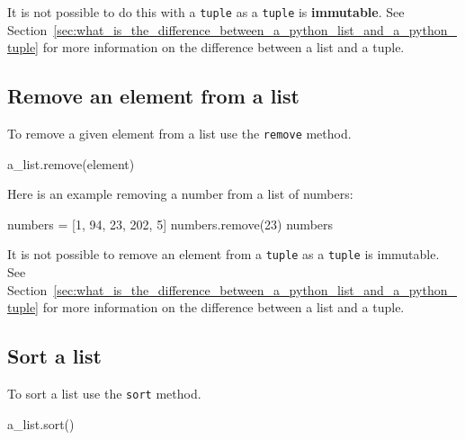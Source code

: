 \begin{note}
It is not possible to do this with a \texttt{tuple} as a \texttt{tuple} is
\textbf{immutable}. See
Section~\ref{sec:what_is_the_difference_between_a_python_list_and_a_python_tuple}
for more information on the difference between a list and a tuple.
\end{note}



\subsection{Remove an element from a list}

To remove a given element from a list use the \texttt{remove} method.


\begin{api}
a_list.remove(element)
\end{api}



Here is an example removing a number from a list of numbers:




\begin{pyin}
numbers = [1, 94, 23, 202, 5]
numbers.remove(23)
numbers
\end{pyin}





\begin{raw}
[1, 94, 202, 5]
\end{raw}





\begin{note}
It is not possible to remove an element from a \texttt{tuple} as a
\texttt{tuple} is
immutable. See
Section~\ref{sec:what_is_the_difference_between_a_python_list_and_a_python_tuple}
for more information on the difference between a list and a tuple.

\end{note}



\subsection{Sort a list}
\label{\detokenize{building-tools/02-functions-and-data-structures/how/main:sort-a-list}}

To sort a list use the \texttt{sort} method.


\begin{api}
a_list.sort()
\end{api}



